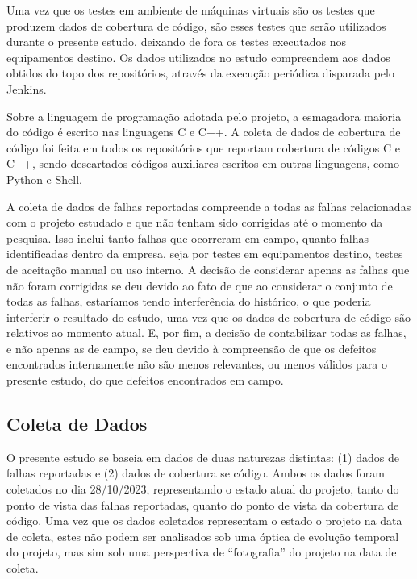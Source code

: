 \documentclass[11.5pt]{article}
\begin{document}
Uma vez que os testes em ambiente de máquinas virtuais são os testes que produzem dados de cobertura
de código, são esses testes que serão utilizados durante o presente estudo, deixando de fora os
testes executados nos equipamentos destino.
Os dados utilizados no estudo compreendem aos dados obtidos do topo dos repositórios, através da
execução periódica disparada pelo Jenkins.

Sobre a linguagem de programação adotada pelo projeto, a esmagadora maioria do código é escrito nas
linguagens C e C++.
A coleta de dados de cobertura de código foi feita em todos os repositórios que reportam cobertura
de códigos C e C++, sendo descartados códigos auxiliares escritos em outras linguagens, como Python
e Shell.

A coleta de dados de falhas reportadas compreende a todas as falhas relacionadas com o projeto
estudado e que não tenham sido corrigidas até o momento da pesquisa.
Isso inclui tanto falhas que ocorreram em campo, quanto falhas identificadas dentro da empresa, seja
por testes em equipamentos destino, testes de aceitação manual ou uso interno.
A decisão de considerar apenas as falhas que não foram corrigidas se deu devido ao fato de que ao
considerar o conjunto de todas as falhas, estaríamos tendo interferência do histórico, o que poderia
interferir o resultado do estudo, uma vez que os dados de cobertura de código são relativos ao
momento atual.
E, por fim, a decisão de contabilizar todas as falhas, e não apenas as de campo, se deu devido à
compreensão de que os defeitos encontrados internamente não são menos relevantes, ou menos válidos
para o presente estudo, do que defeitos encontrados em campo.


\subsection{Coleta de Dados}

O presente estudo se baseia em dados de duas naturezas distintas: (1) dados de falhas reportadas e
(2) dados de cobertura se código.
Ambos os dados foram coletados no dia 28/10/2023, representando o estado atual do projeto, tanto
do ponto de vista das falhas reportadas, quanto do ponto de vista da cobertura de código.
Uma vez que os dados coletados representam o estado o projeto na data de coleta, estes não podem
ser analisados sob uma óptica de evolução temporal do projeto, mas sim sob uma perspectiva de
``fotografia'' do projeto na data de coleta.
\end{document}
